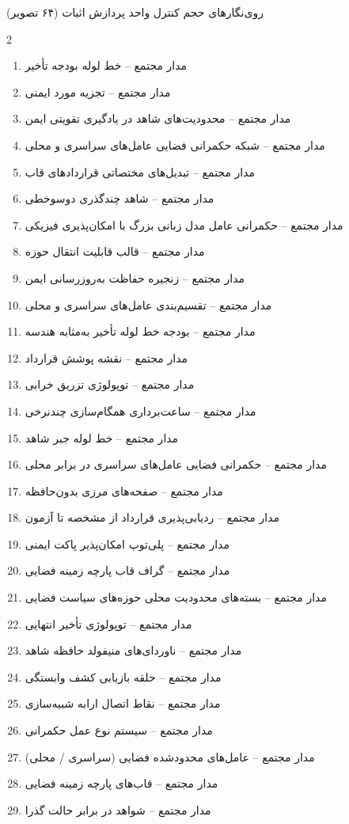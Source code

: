 \documentclass[10pt]{report}
\begin{document}
\begin{mainbox}{روی‌نگارهای حجم کنترل واحد پردازش اثبات (۶۴ تصویر)}
\begin{multicols}{2}
\begin{enumerate}[leftmargin=*, label=\textcolor{primaryBlue}{\textbf{\arabic*.}}, itemsep=2pt, parsep=1pt]
  \item مدار مجتمع – خط لوله بودجه تأخیر
  \item مدار مجتمع – تجزیه مورد ایمنی
  \item مدار مجتمع – محدودیت‌های شاهد در یادگیری تقویتی ایمن
  \item مدار مجتمع – شبکه حکمرانی فضایی عامل‌های سراسری و محلی
  \item مدار مجتمع – تبدیل‌های مختصاتی قراردادهای قاب
  \item مدار مجتمع – شاهد چندگذری دوسوخطی
  \item مدار مجتمع – حکمرانی عامل مدل زبانی بزرگ با امکان‌پذیری فیزیکی
  \item مدار مجتمع – قالب قابلیت انتقال حوزه
  \item مدار مجتمع – زنجیره حفاظت به‌روزرسانی ایمن
  \item مدار مجتمع – تقسیم‌بندی عامل‌های سراسری و محلی
  \item مدار مجتمع – بودجه خط لوله تأخیر به‌مثابه هندسه
  \item مدار مجتمع – نقشه پوشش قرارداد
  \item مدار مجتمع – توپولوژی تزریق خرابی
  \item مدار مجتمع – ساعت‌برداری همگام‌سازی چندنرخی
  \item مدار مجتمع – خط لوله جبر شاهد
  \item مدار مجتمع – حکمرانی فضایی عامل‌های سراسری در برابر محلی
  \item مدار مجتمع – صفحه‌های مرزی بدون‌حافظه
  \item مدار مجتمع – ردیابی‌پذیری قرارداد از مشخصه تا آزمون
  \item مدار مجتمع – پلی‌توپ امکان‌پذیر پاکت ایمنی
  \item مدار مجتمع – گراف قاب پارچه زمینه فضایی
  \item مدار مجتمع – بسته‌های محدودیت محلی حوزه‌های سیاست فضایی
  \item مدار مجتمع – توپولوژی تأخیر انتهایی
  \item مدار مجتمع – ناوردای‌های منیفولد حافظه شاهد
  \item مدار مجتمع – حلقه بازیابی کشف وابستگی
  \item مدار مجتمع – نقاط اتصال ارابه شبیه‌سازی
  \item مدار مجتمع – سیستم نوع عمل حکمرانی
  \item مدار مجتمع – عامل‌های محدودشده فضایی (سراسری / محلی)
  \item مدار مجتمع – قاب‌های پارچه زمینه فضایی
  \item مدار مجتمع – شواهد در برابر حالت گذرا

\end{enumerate}
\end{multicols}
\end{mainbox}
\end{document}
